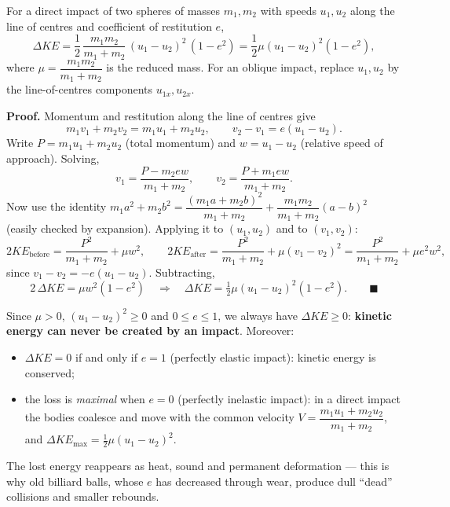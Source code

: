 \documentclass[11pt]{article}
\newcommand{\cle}[1]{{\popxbold\color{popdark}#1}}
\begin{document}
\begin{propriete}
For a direct impact of two spheres of masses $m_1, m_2$ with speeds $u_1, u_2$ along the line of centres and coefficient of restitution $e$,
\[
\Delta KE = \frac{1}{2}\,\frac{m_1 m_2}{m_1 + m_2}\,(u_1 - u_2)^2\,(1 - e^2) = \frac{1}{2}\mu (u_1-u_2)^2(1-e^2),
\]
where $\mu = \dfrac{m_1m_2}{m_1+m_2}$ is the \cle{reduced mass}. For an oblique impact, replace $u_1, u_2$ by the line-of-centres components $u_{1x}, u_{2x}$.
\end{propriete}

\textbf{Proof.} Momentum and restitution along the line of centres give
\[
m_1 v_1 + m_2 v_2 = m_1 u_1 + m_2 u_2, \qquad v_2 - v_1 = e(u_1 - u_2).
\]
Write $P = m_1u_1 + m_2u_2$ (total momentum) and $w = u_1 - u_2$ (relative speed of approach). Solving,
\[
v_1 = \frac{P - m_2 e w}{m_1+m_2}, \qquad v_2 = \frac{P + m_1 e w}{m_1+m_2}.
\]
Now use the identity $m_1 a^2 + m_2 b^2 = \dfrac{(m_1 a + m_2 b)^2}{m_1+m_2} + \dfrac{m_1m_2}{m_1+m_2}(a-b)^2$ (easily checked by expansion). Applying it to $(u_1,u_2)$ and to $(v_1,v_2)$:
\[
2KE_{\text{before}} = \frac{P^2}{m_1+m_2} + \mu w^2, \qquad 2KE_{\text{after}} = \frac{P^2}{m_1+m_2} + \mu (v_1-v_2)^2 = \frac{P^2}{m_1+m_2} + \mu e^2 w^2,
\]
since $v_1 - v_2 = -e(u_1-u_2)$. Subtracting,
\[
2\,\Delta KE = \mu w^2(1 - e^2) \quad\Longrightarrow\quad \Delta KE = \tfrac{1}{2}\mu (u_1-u_2)^2(1-e^2). \qquad \blacksquare
\]

\begin{propriete}
Since $\mu > 0$, $(u_1-u_2)^2 \geq 0$ and $0 \leq e \leq 1$, we always have $\Delta KE \geq 0$: \textbf{kinetic energy can never be created by an impact}. Moreover:
\begin{itemize}
  \item $\Delta KE = 0$ if and only if $e = 1$ (perfectly elastic impact): kinetic energy is conserved;
  \item the loss is \emph{maximal} when $e = 0$ (perfectly inelastic impact): in a direct impact the bodies coalesce and move with the common velocity $V = \dfrac{m_1u_1 + m_2u_2}{m_1+m_2}$, and $\Delta KE_{\max} = \tfrac{1}{2}\mu(u_1-u_2)^2$.
\end{itemize}
The lost energy reappears as heat, sound and permanent deformation — this is why old billiard balls, whose $e$ has decreased through wear, produce dull ``dead'' collisions and smaller rebounds.
\end{propriete}
\end{document}
